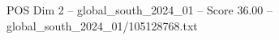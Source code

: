\begin{textsample}{POS Dim 2 – global\_south\_2024\_01 – Score 36.00 – global\_south\_2024\_01/105128768.txt}
\end{textsample}
